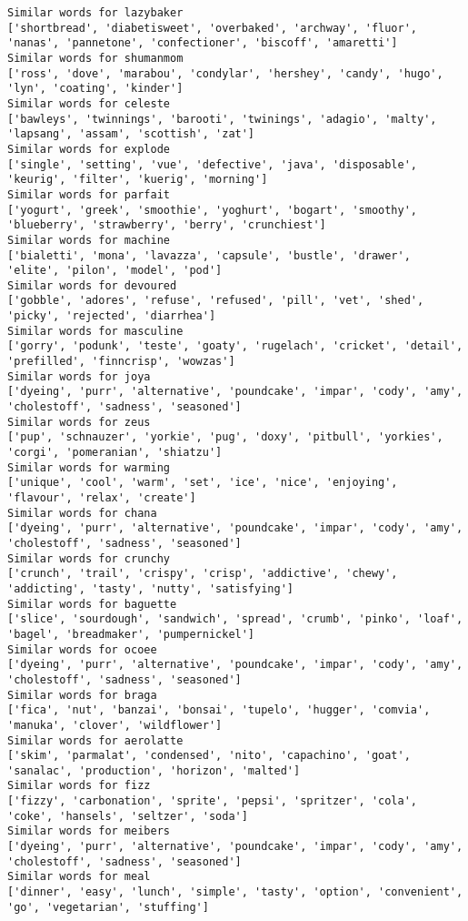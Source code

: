 \documentclass[11pt]{article}
\begin{document}
\begin{Verbatim}[commandchars=\\\{\}]
Similar words for lazybaker
['shortbread', 'diabetisweet', 'overbaked', 'archway', 'fluor', 'nanas', 'pannetone', 'confectioner', 'biscoff', 'amaretti']
Similar words for shumanmom
['ross', 'dove', 'marabou', 'condylar', 'hershey', 'candy', 'hugo', 'lyn', 'coating', 'kinder']
Similar words for celeste
['bawleys', 'twinnings', 'barooti', 'twinings', 'adagio', 'malty', 'lapsang', 'assam', 'scottish', 'zat']
Similar words for explode
['single', 'setting', 'vue', 'defective', 'java', 'disposable', 'keurig', 'filter', 'kuerig', 'morning']
Similar words for parfait
['yogurt', 'greek', 'smoothie', 'yoghurt', 'bogart', 'smoothy', 'blueberry', 'strawberry', 'berry', 'crunchiest']
Similar words for machine
['bialetti', 'mona', 'lavazza', 'capsule', 'bustle', 'drawer', 'elite', 'pilon', 'model', 'pod']
Similar words for devoured
['gobble', 'adores', 'refuse', 'refused', 'pill', 'vet', 'shed', 'picky', 'rejected', 'diarrhea']
Similar words for masculine
['gorry', 'podunk', 'teste', 'goaty', 'rugelach', 'cricket', 'detail', 'prefilled', 'finncrisp', 'wowzas']
Similar words for joya
['dyeing', 'purr', 'alternative', 'poundcake', 'impar', 'cody', 'amy', 'cholestoff', 'sadness', 'seasoned']
Similar words for zeus
['pup', 'schnauzer', 'yorkie', 'pug', 'doxy', 'pitbull', 'yorkies', 'corgi', 'pomeranian', 'shiatzu']
Similar words for warming
['unique', 'cool', 'warm', 'set', 'ice', 'nice', 'enjoying', 'flavour', 'relax', 'create']
Similar words for chana
['dyeing', 'purr', 'alternative', 'poundcake', 'impar', 'cody', 'amy', 'cholestoff', 'sadness', 'seasoned']
Similar words for crunchy
['crunch', 'trail', 'crispy', 'crisp', 'addictive', 'chewy', 'addicting', 'tasty', 'nutty', 'satisfying']
Similar words for baguette
['slice', 'sourdough', 'sandwich', 'spread', 'crumb', 'pinko', 'loaf', 'bagel', 'breadmaker', 'pumpernickel']
Similar words for ocoee
['dyeing', 'purr', 'alternative', 'poundcake', 'impar', 'cody', 'amy', 'cholestoff', 'sadness', 'seasoned']
Similar words for braga
['fica', 'nut', 'banzai', 'bonsai', 'tupelo', 'hugger', 'comvia', 'manuka', 'clover', 'wildflower']
Similar words for aerolatte
['skim', 'parmalat', 'condensed', 'nito', 'capachino', 'goat', 'sanalac', 'production', 'horizon', 'malted']
Similar words for fizz
['fizzy', 'carbonation', 'sprite', 'pepsi', 'spritzer', 'cola', 'coke', 'hansels', 'seltzer', 'soda']
Similar words for meibers
['dyeing', 'purr', 'alternative', 'poundcake', 'impar', 'cody', 'amy', 'cholestoff', 'sadness', 'seasoned']
Similar words for meal
['dinner', 'easy', 'lunch', 'simple', 'tasty', 'option', 'convenient', 'go', 'vegetarian', 'stuffing']

\end{Verbatim}
\end{document}
